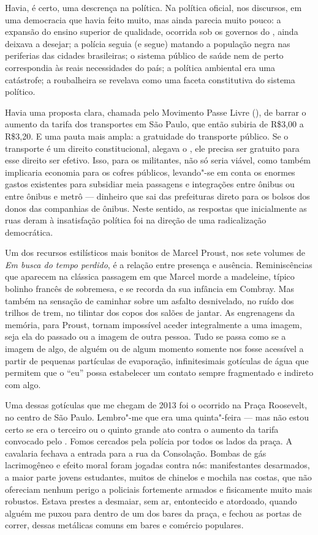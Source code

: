 Havia, é certo, uma descrença na política. Na política oficial, nos
discursos, em uma democracia que havia feito muito, mas ainda parecia
muito pouco: a expansão do ensino superior de qualidade, ocorrida sob os governos do , ainda deixava a desejar; a polícia
seguia (e segue) matando a população negra nas periferias das cidades
brasileiras; o sistema público de saúde nem de perto correspondia às
reais necessidades do país; a política ambiental era uma catástrofe; a
roubalheira se revelava como uma faceta constitutiva do sistema
político.

Havia uma proposta clara, chamada pelo Movimento Passe Livre
(), de barrar o aumento da tarifa dos transportes em São Paulo, que então subiria
de R\$3,00 a R\$3,20. E uma pauta mais ampla: a gratuidade do transporte
público. Se o transporte é um direito constitucional, alegava o , ele
precisa ser gratuito para esse direito ser efetivo. Isso, para os
militantes, não só seria viável, como também implicaria economia para os cofres
públicos, levando"-se em conta os enormes gastos existentes para
subsidiar meia passagens e integrações entre ônibus ou entre ônibus e
metrô --- dinheiro que sai das prefeituras direto para os bolsos dos
donos das companhias de ônibus. Neste sentido, as respostas que
inicialmente as ruas deram à insatisfação política foi na direção de uma
radicalização democrática.

Um dos recursos estilísticos mais bonitos de Marcel Proust, nos sete
volumes de \emph{Em busca do tempo perdido}, é a relação entre presença
e ausência. Reminiscências que aparecem na clássica passagem em que
Marcel morde a madeleine, típico bolinho francês de sobremesa, e se recorda da sua infância em Combray. Mas
também na sensação de caminhar sobre um asfalto desnivelado, no
ruído dos trilhos de trem, no tilintar dos copos dos salões de jantar.
As engrenagens da memória, para Proust, tornam impossível aceder
integralmente a uma imagem, seja ela do passado ou a imagem de outra %
pessoa. Tudo se passa como se a imagem de algo, de alguém ou de algum
momento somente nos fosse acessível a partir de pequenas partículas de
evaporação, infinitesimais gotículas de água que permitem que o ``eu''
possa estabelecer um contato sempre fragmentado e indireto com algo.

Uma dessas gotículas que me chegam de 2013 foi o ocorrido na Praça
Roosevelt, no centro de São Paulo. Lembro"-me que era uma quinta"-feira ---
mas não estou certo se era o terceiro ou o quinto grande ato contra o
aumento da tarifa convocado pelo . Fomos cercados pela polícia por
todos os lados da praça. A cavalaria fechava a entrada para a rua da
Consolação. Bombas de gás lacrimogêneo e efeito moral foram jogadas
contra nós: manifestantes desarmados, a maior parte jovens estudantes,
muitos de chinelos e mochila nas costas, que não ofereciam nenhum perigo
a policiais fortemente armados e fisicamente muito mais robustos. Estava
prestes a desmaiar, sem ar, entontecido e atordoado, quando alguém me
puxou para dentro de um dos bares da praça, e fechou as portas de
correr, dessas metálicas comuns em bares e comércio populares.

